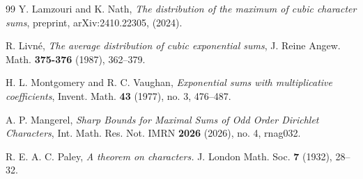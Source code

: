 \documentclass[12pt]{amsart}
\theoremstyle{definition}
\numberwithin{equation}{section}
\numberwithin{equation}{section}
\begin{document}
\begin{thebibliography}{99}
     Y. Lamzouri and K. Nath, {\em The distribution of the maximum of cubic character sums}, preprint, arXiv:2410.22305, (2024).
  

	  R. Livné,
	  \emph{The average distribution of cubic exponential sums}, J. Reine Angew. Math. 
    \textbf{375-376} (1987), 362--379.

	  H. L. Montgomery and R. C. Vaughan, \emph{Exponential sums with multiplicative coefficients}, Invent. Math. \textbf{43} (1977), no. 3, 476--487.


A. P. Mangerel,
\emph{Sharp Bounds for Maximal Sums of Odd Order Dirichlet Characters},
Int. Math. Res. Not. IMRN \textbf{2026} (2026), no. 4, rnag032.


     R. E. A. C. Paley, \emph{A theorem on characters.} J. London Math. Soc. \textbf{7} (1932), 28--32.

    
\end{thebibliography}
\end{document}
